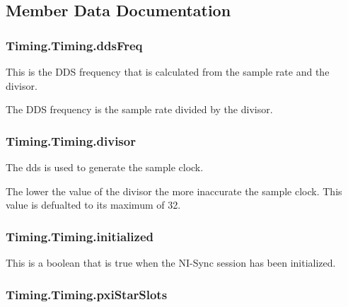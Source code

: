 \subsection{Member Data Documentation}
\hypertarget{class_timing_1_1_timing_a6df1c9bf5ff79f8f93242f2f52d5c38a}{
\subsubsection[{dds\-Freq}]{\setlength{\rightskip}{0pt plus 5cm}Timing.\-Timing.\-dds\-Freq}}\label{class_timing_1_1_timing_a6df1c9bf5ff79f8f93242f2f52d5c38a}


This is the D\-D\-S frequency that is calculated from the sample rate and the divisor. 

The D\-D\-S frequency is the sample rate divided by the divisor. \hypertarget{class_timing_1_1_timing_acb98ae4190c94c258c1f86060ab27a86}{
\subsubsection[{divisor}]{\setlength{\rightskip}{0pt plus 5cm}Timing.\-Timing.\-divisor}}\label{class_timing_1_1_timing_acb98ae4190c94c258c1f86060ab27a86}


The dds is used to generate the sample clock. 

The lower the value of the divisor the more inaccurate the sample clock. This value is defualted to its maximum of 32. \hypertarget{class_timing_1_1_timing_a802c666b56edd255e17036d5317af75c}{
\subsubsection[{initialized}]{\setlength{\rightskip}{0pt plus 5cm}Timing.\-Timing.\-initialized}}\label{class_timing_1_1_timing_a802c666b56edd255e17036d5317af75c}


This is a boolean that is true when the N\-I-\/\-Sync session has been initialized. 

\hypertarget{class_timing_1_1_timing_a42cacaad767cfee65072c72471a5b3a6}{
\subsubsection[{pxi\-Star\-Slots}]{\setlength{\rightskip}{0pt plus 5cm}Timing.\-Timing.\-pxi\-Star\-Slots}}\label{class_timing_1_1_timing_a42cacaad767cfee65072c72471a5b3a6}


